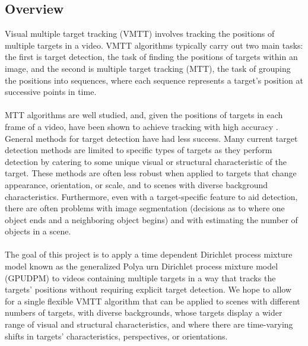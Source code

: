 \documentclass{article}
\begin{document}
\subsection*{Overview}
\vspace{6pt}
Visual multiple target tracking (VMTT) involves tracking the positions of multiple targets in a video. VMTT algorithms typically carry out two main tasks: the first is target detection, the task of finding the positions of targets within an image, and the second is multiple target tracking (MTT), the task of grouping the positions into sequences, where each sequence represents a target's position at successive points in time. \\
\\
MTT algorithms are well studied, and, given the positions of targets in each frame of a video, have been shown to achieve tracking with high accuracy \cite{blackman_2004}. General methods for target detection have had less success. Many current target detection methods are limited to specific types of targets as they perform detection by catering to some unique visual or structural characteristic of the target. These methods are often less robust when applied to targets that change appearance, orientation, or scale, and to scenes with diverse background characteristics. Furthermore, even with a target-specific feature to aid detection, there are often problems with image segmentation (decisions as to where one object ends and a neighboring object begins) and with estimating the number of objects in a scene.  \\
\\
The goal of this project is to apply a time dependent Dirichlet process mixture model known as the generalized Polya urn Dirichlet process mixture model (GPUDPM) to videos containing multiple targets in a way that tracks the targets' positions without requiring explicit target detection. We hope to allow for a 	single flexible VMTT algorithm that can be applied to scenes with different numbers of targets, with diverse backgrounds, whose targets display a wider range of visual and structural characteristics, and where there are time-varying shifts in targets' characteristics, perspectives, or orientations.\\
\end{document}
